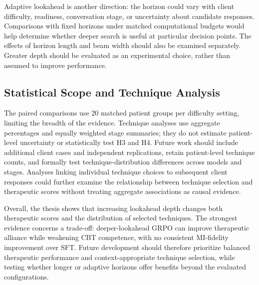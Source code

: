 Adaptive lookahead is another direction: the horizon could vary with client difficulty, readiness, conversation stage, or uncertainty about candidate responses. Comparisons with fixed horizons under matched computational budgets would help determine whether deeper search is useful at particular decision points. The effects of horizon length and beam width should also be examined separately. Greater depth should be evaluated as an experimental choice, rather than assumed to improve performance.

\subsection{Statistical Scope and Technique Analysis}

The paired comparisons use 20 matched patient groups per difficulty setting, limiting the breadth of the evidence. Technique analyses use aggregate percentages and equally weighted stage summaries; they do not estimate patient-level uncertainty or statistically test H3 and H4. Future work should include additional client cases and independent replications, retain patient-level technique counts, and formally test technique-distribution differences across models and stages. Analyses linking individual technique choices to subsequent client responses could further examine the relationship between technique selection and therapeutic scores without treating aggregate associations as causal evidence.

Overall, the thesis shows that increasing lookahead depth changes both therapeutic scores and the distribution of selected techniques. The strongest evidence concerns a trade-off: deeper-lookahead GRPO can improve therapeutic alliance while weakening CBT competence, with no consistent MI-fidelity improvement over SFT. Future development should therefore prioritize balanced therapeutic performance and context-appropriate technique selection, while testing whether longer or adaptive horizons offer benefits beyond the evaluated configurations.
